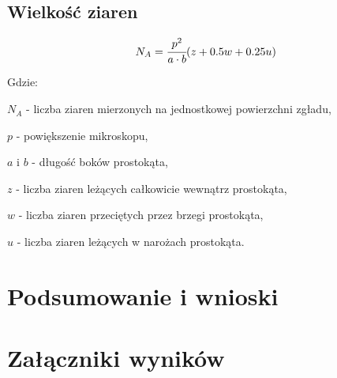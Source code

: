 \documentclass[a4paper,12pt]{article}
\begin{document}
\subsection{Wielkość ziaren}

$$N_A=\cfrac{p^2}{a\cdot b}(z+0.5w+0.25u)$$

Gdzie:

$N_A$ - liczba ziaren mierzonych na jednostkowej powierzchni zgładu,

$p$ - powiększenie mikroskopu,

$a$ i $b$ - długość boków prostokąta,

$z$ - liczba ziaren leżących całkowicie wewnątrz prostokąta,

$w$ - liczba ziaren przeciętych przez brzegi prostokąta,

$u$ - liczba ziaren leżących w narożach prostokąta.


\section{Podsumowanie i wnioski}

\section{Załączniki wyników}
\end{document}
